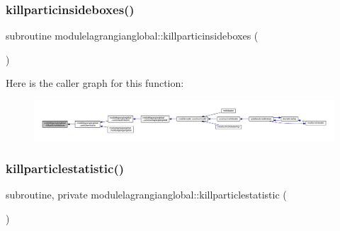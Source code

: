 \subsubsection{\texorpdfstring{killparticinsideboxes()}{killparticinsideboxes()}}
{\footnotesize\ttfamily subroutine modulelagrangianglobal\+::killparticinsideboxes (\begin{DoxyParamCaption}{ }\end{DoxyParamCaption})\hspace{0.3cm}{\ttfamily [private]}}

Here is the caller graph for this function\+:\nopagebreak
\begin{figure}[H]
\begin{center}
\leavevmode
\includegraphics[width=350pt]{namespacemodulelagrangianglobal_a8d6c65d3eba55f99706d464f633f31b3_icgraph}
\end{center}
\end{figure}
\mbox{\label{namespacemodulelagrangianglobal_a3ce834e6c05495002ac0eda8b4096d0e}} 
\subsubsection{\texorpdfstring{killparticlestatistic()}{killparticlestatistic()}}
{\footnotesize\ttfamily subroutine, private modulelagrangianglobal\+::killparticlestatistic (\begin{DoxyParamCaption}{ }\end{DoxyParamCaption})\hspace{0.3cm}{\ttfamily [private]}}

